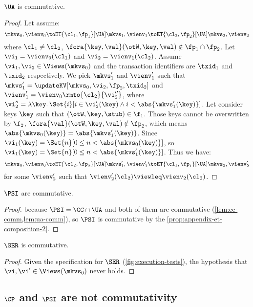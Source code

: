 \begin{lemma}
    \label{lem:ua-comm}
    \(\UA\) is commutative.
\end{lemma}
\begin{proof}
    Let assume:
    \[
        \mkvs_0, \vienv_0 \toET{\cl_1, \fp_1}[\UA] \mkvs_1, \vienv_1 \toET{\cl_2, \fp_2}[\UA] \mkvs_2, \vienv_2 
    \]
    where \( \cl_1 \neq \cl_2 \), \( \fora{ \key,\val } (\otW, \key, \val) \notin \fp_1 \cap \fp_2 \).
    Let \(\vi_1 = \vienv_0(\cl_1) \) and \( \vi_2 = \vienv_1(\cl_2)\).
    Assume \(\vi_1, \vi_2 \in \Views(\mkvs_0)\) and the transaction identifiers are \( \txid_1 \) and \( \txid_2 \) respectively.
    We pick \( \mkvs'_1 \) and \( \vienv'_1 \) such that \( \mkvs'_1 = \updateKV[\mkvs_0,\vi_2,\fp_2,\txid_2] \) and \( \vienv'_1 = \vienv_0\rmto{\cl_2}{\vi''_2} \),
    where \( \vi''_2 = \lambda \key \ldotp \Set{ i }[ i \in \vi'_2(\key) \land i < \abs{\mkvs'_1(\key)}] \).
    Let consider keys \( \key \) such that \( (\otW,\key,\stub) \in \f_1 \).
    Those keys cannot be overwritten by \( \f_2 \), \ie \( \fora{\val} (\otW,\key,\val) \notin \fp_2 \),
    which means \( \abs{\mkvs_0(\key)} = \abs{\mkvs'_1(\key)} \).
    Since \( \vi_1(\key) = \Set{n}[0 \leq n < \abs{\mkvs_0(\key)}]\), so \( \vi_1(\key) = \Set{n}[0 \leq n < \abs{\mkvs'_1(\key)}]\).
    Thus we have:
    \[
        \mkvs_0, \vienv_0 \toET{\cl_2, \fp_2}[\UA] \mkvs'_1, \vienv'_1 \toET{\cl_1,\fp_1}[\UA] \mkvs_2, \vienv'_2 
    \]
    for some \( \vienv'_2 \) such that \( \vienv'_2(\cl_2) \viewleq \vienv_2(\cl_2) \).
\end{proof}

\begin{proposition}
    \( \PSI \) are commutative.
\end{proposition}
\begin{proof}
    because \( \PSI = \CC \cap \UA \) and both of them are commutative (\cref{lem:cc-comm,lem:ua-comm}), so \( \PSI \) is commutative by the \cref{prop:appendix-et-composition-2}.
\end{proof}

\begin{lemma}
    \label{lem:ser-comm}
    \( \SER \) is commutative.
\end{lemma}
\begin{proof}
    Given the specification for \( \SER \) (\cref{fig:execution-tests}), the hypothesis that \( \vi, \vi' \in \Views(\mkvs_0) \) never holds.
\end{proof}

\subsection{\( \CP \) and \( \PSI \) are not commutativity}
\label{sec:comm-counter-cp-si}

